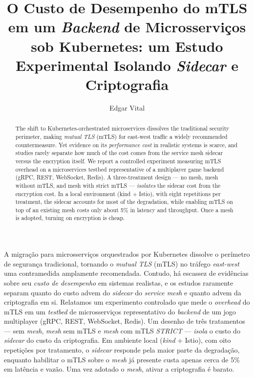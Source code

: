 \documentclass[12pt]{article}
\title{O Custo de Desempenho do mTLS em um \textit{Backend} de Microsservi\c{c}os sob Kubernetes: um Estudo Experimental Isolando \textit{Sidecar} e Criptografia}
\author{Edgar Vital\inst{1}}
\begin{document}
\maketitle

\begin{abstract}
The shift to Kubernetes-orchestrated microservices dissolves the traditional security perimeter, making \textit{mutual TLS} (mTLS) for east-west traffic a widely recommended countermeasure. Yet evidence on its \emph{performance cost} in realistic systems is scarce, and studies rarely separate how much of the cost comes from the service mesh sidecar versus the encryption itself. We report a controlled experiment measuring mTLS overhead on a microservices testbed representative of a multiplayer game backend (gRPC, REST, WebSocket, Redis). A three-treatment design --- no mesh, mesh without mTLS, and mesh with strict mTLS --- \emph{isolates} the sidecar cost from the encryption cost. In a local environment (kind + Istio), with eight repetitions per treatment, the sidecar accounts for most of the degradation, while enabling mTLS on top of an existing mesh costs only about 5\% in latency and throughput. Once a mesh is adopted, turning on encryption is cheap.
\end{abstract}

\begin{resumo}
A migra\c{c}\~ao para microsservi\c{c}os orquestrados por Kubernetes dissolve o per\'imetro de seguran\c{c}a tradicional, tornando o \textit{mutual TLS} (mTLS) no tr\'afego \textit{east-west} uma contramedida amplamente recomendada. Contudo, h\'a escassez de evid\^encias sobre seu \emph{custo de desempenho} em sistemas realistas, e os estudos raramente separam quanto do custo advem do \textit{sidecar} do \textit{service mesh} e quanto advem da criptografia em si. Relatamos um experimento controlado que mede o \textit{overhead} do mTLS em um \textit{testbed} de microsservi\c{c}os representativo do \textit{backend} de um jogo multiplayer (gRPC, REST, WebSocket, Redis). Um desenho de tr\^es tratamentos --- sem \textit{mesh}, \textit{mesh} sem mTLS e \textit{mesh} com mTLS \textit{STRICT} --- \emph{isola} o custo do \textit{sidecar} do custo da criptografia. Em ambiente local (\textit{kind} + Istio), com oito repeti\c{c}\~oes por tratamento, o \textit{sidecar} responde pela maior parte da degrada\c{c}\~ao, enquanto habilitar o mTLS sobre o \textit{mesh} j\'a presente custa apenas cerca de 5\% em lat\^encia e vaz\~ao. Uma vez adotado o \textit{mesh}, ativar a criptografia \'e barato.
\end{resumo}
\end{document}
